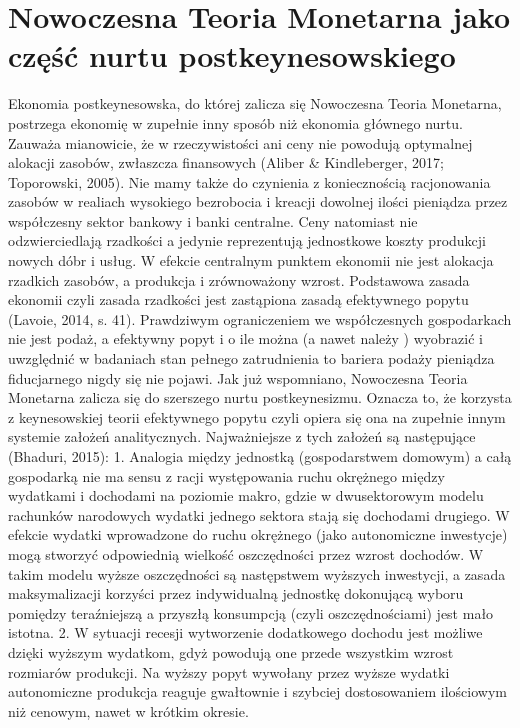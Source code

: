 \documentclass[
]{book}
\begin{document}
\hypertarget{nowoczesna-teoria-monetarna-jako-czux119ux15bux107-nurtu-postkeynesowskiego}{%
\section{Nowoczesna Teoria Monetarna jako część nurtu postkeynesowskiego}\label{nowoczesna-teoria-monetarna-jako-czux119ux15bux107-nurtu-postkeynesowskiego}}

Ekonomia postkeynesowska, do której zalicza się Nowoczesna Teoria Monetarna, postrzega ekonomię w zupełnie inny sposób niż ekonomia głównego nurtu. Zauważa mianowicie, że w rzeczywistości ani ceny nie powodują optymalnej alokacji zasobów, zwłaszcza finansowych (Aliber \& Kindleberger, 2017; Toporowski, 2005). Nie mamy także do czynienia z koniecznością racjonowania zasobów w realiach wysokiego bezrobocia i kreacji dowolnej ilości pieniądza przez współczesny sektor bankowy i banki centralne. Ceny natomiast nie odzwierciedlają rzadkości a jedynie reprezentują jednostkowe koszty produkcji nowych dóbr i usług. W efekcie centralnym punktem ekonomii nie jest alokacja rzadkich zasobów, a produkcja i zrównoważony wzrost. Podstawowa zasada ekonomii czyli zasada rzadkości jest zastąpiona zasadą efektywnego popytu (Lavoie, 2014, s. 41). Prawdziwym ograniczeniem we współczesnych gospodarkach nie jest podaż, a efektywny popyt i o ile można (a nawet należy ) wyobrazić i uwzględnić w badaniach stan pełnego zatrudnienia to bariera podaży pieniądza fiducjarnego nigdy się nie pojawi.
Jak już wspomniano, Nowoczesna Teoria Monetarna zalicza się do szerszego nurtu postkeynesizmu. Oznacza to, że korzysta z keynesowskiej teorii efektywnego popytu czyli opiera się ona na zupełnie innym systemie założeń analitycznych. Najważniejsze z tych założeń są następujące (Bhaduri, 2015):
1. Analogia między jednostką (gospodarstwem domowym) a całą gospodarką nie ma sensu z racji występowania ruchu okrężnego między wydatkami i dochodami na poziomie makro, gdzie w dwusektorowym modelu rachunków narodowych wydatki jednego sektora stają się dochodami drugiego. W efekcie wydatki wprowadzone do ruchu okrężnego (jako autonomiczne inwestycje) mogą stworzyć odpowiednią wielkość oszczędności przez wzrost dochodów. W takim modelu wyższe oszczędności są następstwem wyższych inwestycji, a zasada maksymalizacji korzyści przez indywidualną jednostkę dokonującą wyboru pomiędzy teraźniejszą a przyszłą konsumpcją (czyli oszczędnościami) jest mało istotna.
2. W sytuacji recesji wytworzenie dodatkowego dochodu jest możliwe dzięki wyższym wydatkom, gdyż powodują one przede wszystkim wzrost rozmiarów produkcji. Na wyższy popyt wywołany przez wyższe wydatki autonomiczne produkcja reaguje gwałtownie i szybciej dostosowaniem ilościowym niż cenowym, nawet w krótkim okresie.
\end{document}
